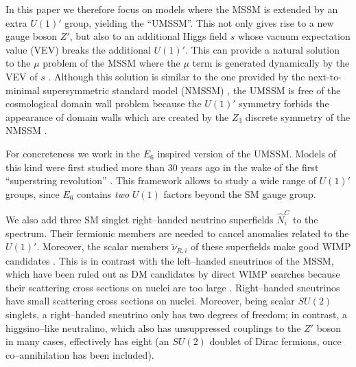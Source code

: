 \documentclass[a4paper,11pt]{article}
\begin{document}
In this paper we therefore focus on models where the MSSM is extended
by an extra $U(1)'$ group, yielding the ``UMSSM''. This not only gives
rise to a new gauge boson $Z'$, but also to an additional Higgs field
$s$ whose vacuum expectation value (VEV) breaks the additional
$U(1)'$. This can provide a natural solution to the $\mu$ problem of
the MSSM \cite{Kim:1983dt} where the $\mu$ term is generated
dynamically by the VEV of $s$ \cite{Cvetic:1997ky}. Although this
solution is similar to the one provided by the next-to-minimal
supersymmetric standard model (NMSSM) \cite{Ellwanger:2009dp}, the
UMSSM is free of the cosmological domain wall problem because the
$U(1)'$ symmetry forbids the appearance of domain walls which are
created by the $Z_{3}$ discrete symmetry of the NMSSM
\cite{Han:2004yd}. 

For concreteness we work in the $E_6$ inspired version of the UMSSM.
Models of this kind were first studied more than 30 years ago in the
wake of the first ``superstring revolution'' \cite{London:1986dk,
  Hewett:1988xc}. This framework allows to study a wide range of
$U(1)'$ groups, since $E_6$ contains {\em two} $U(1)$ factors beyond
the SM gauge group.

We also add three SM singlet right--handed neutrino superfields
$\hat N^C_i$ to the spectrum. Their fermionic members are needed to cancel
anomalies related to the $U(1)'$. Moreover, the scalar members
$\tilde \nu_{R,i}$ of these superfields make good WIMP candidates
\cite{Lee:2007mt, Cerdeno:2008ep, Allahverdi:2009ae, Khalil:2011tb,
  Belanger:2011rs, Belanger:2015cra, Belanger:2017vpq}. This is in
contrast with the left--handed sneutrinos of the MSSM, which have been
ruled out as DM candidates by direct WIMP searches because their
scattering cross sections on nuclei are too large
\cite{Falk:1994es}. Right--handed sneutrinos have small scattering
cross sections on nuclei. Moreover, being scalar $SU(2)$ singlets, a
right--handed sneutrino only has two degrees of freedom; in contrast,
a higgsino--like neutralino, which also has unsuppressed couplings to
the $Z'$ boson in many cases, effectively has eight (an $SU(2)$
doublet of Dirac fermions, once co--annihilation has been included).
\end{document}
